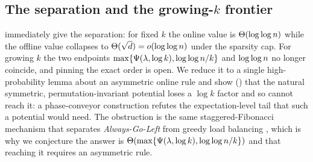 \subsection{The separation and the growing-$k$ frontier}\label{sec:ov-sep}

 immediately give the separation: for fixed $k$ the online value is $\Theta(\log\log n)$ while the
offline value collapses to $\Theta(\sqrt d)=o(\log\log n)$ under the sparsity cap. For growing $k$ the two endpoints
$\max\{\Psi(\lambda,\log k),\log\log n/k\}$ and $\log\log n$ no longer coincide, and pinning the exact order is open. We reduce it
to a single high-probability lemma about an asymmetric online rule and show () that the natural symmetric,
permutation-invariant potential loses a $\log k$ factor and so cannot reach it: a phase-conveyor construction refutes the
expectation-level tail that such a potential would need. The obstruction is the same staggered-Fibonacci mechanism that separates \emph{Always-Go-Left}
from greedy load balancing \cite{Vocking2003}, which is why we conjecture the answer is
$\Theta(\max\{\Psi(\lambda,\log k),\log\log n/k\})$ and that reaching it requires an asymmetric rule.
